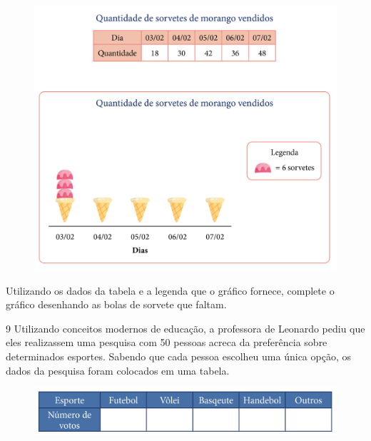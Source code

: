 \begin{figure}[htpb!]
\centering
\includegraphics[width=\textwidth]{../ilustracoes/MAT5/SAEB_5ANO_MAT_figura61.png}
\end{figure}

Utilizando os dados da tabela e a legenda que o gráfico fornece,
complete o gráfico desenhando as bolas de sorvete que faltam.


\pagebreak
\num{9} Utilizando conceitos modernos de educação, a professora de Leonardo
pediu que eles realizassem uma pesquisa com 50 pessoas acreca da
preferência sobre determinados esportes. Sabendo que cada pessoa
escolheu uma única opção, os dados da pesquisa foram colocados em uma tabela.

\begin{figure}[htpb!]
\includegraphics[width=\textwidth]{../ilustracoes/MAT5/SAEB_5ANO_MAT_figura62.png}
\end{figure}

